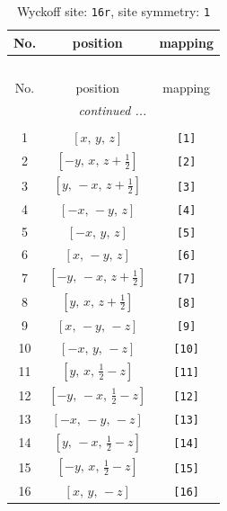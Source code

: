 \documentclass[fleqn,8pt]{jsarticle}
\begin{document}
\begin{longtable}{ccc}
\caption{Wyckoff site: {\tt 16r}, site symmetry: {\tt 1}}
 \\
 \hline \hline
No. & position & mapping \\ \hline \endfirsthead

\multicolumn{2}{l}{\tablename\ \thetable{}} \\
 \hline \hline
No. & position & mapping \\ \hline \endhead

 \hline \hline
\multicolumn{2}{r}{\footnotesize\it continued ...} \\ \endfoot

 \hline \hline
\multicolumn{2}{r}{} \\ \endlastfoot

1 & $\left[ x,\, y,\, z \right]$ & {\tt [1]} \\ \hline
2 & $\left[ - y,\, x,\, z + \frac{1}{2} \right]$ & {\tt [2]} \\ \hline
3 & $\left[ y,\, - x,\, z + \frac{1}{2} \right]$ & {\tt [3]} \\ \hline
4 & $\left[ - x,\, - y,\, z \right]$ & {\tt [4]} \\ \hline
5 & $\left[ - x,\, y,\, z \right]$ & {\tt [5]} \\ \hline
6 & $\left[ x,\, - y,\, z \right]$ & {\tt [6]} \\ \hline
7 & $\left[ - y,\, - x,\, z + \frac{1}{2} \right]$ & {\tt [7]} \\ \hline
8 & $\left[ y,\, x,\, z + \frac{1}{2} \right]$ & {\tt [8]} \\ \hline
9 & $\left[ x,\, - y,\, - z \right]$ & {\tt [9]} \\ \hline
10 & $\left[ - x,\, y,\, - z \right]$ & {\tt [10]} \\ \hline
11 & $\left[ y,\, x,\, \frac{1}{2} - z \right]$ & {\tt [11]} \\ \hline
12 & $\left[ - y,\, - x,\, \frac{1}{2} - z \right]$ & {\tt [12]} \\ \hline
13 & $\left[ - x,\, - y,\, - z \right]$ & {\tt [13]} \\ \hline
14 & $\left[ y,\, - x,\, \frac{1}{2} - z \right]$ & {\tt [14]} \\ \hline
15 & $\left[ - y,\, x,\, \frac{1}{2} - z \right]$ & {\tt [15]} \\ \hline
16 & $\left[ x,\, y,\, - z \right]$ & {\tt [16]} \\
\end{longtable}
\end{document}
